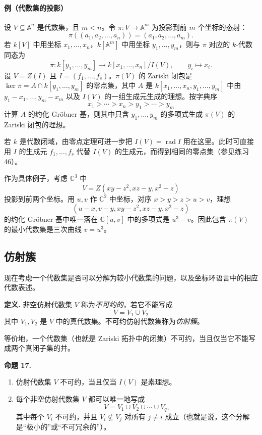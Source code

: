 \paragraph{例（代数集的投影）}
设 $V\subseteq\mathbb A^n$ 是代数集，且 $m<n$。令 $\pi:V\to\mathbb A^m$ 为投影到前 $m$ 个坐标的态射：
\[
\pi((a_1,a_2,\ldots,a_n))=(a_1,a_2,\ldots,a_m).
\]
若 $k[V]$ 中用坐标 $x_1,
\ldots,x_n$，$k[\mathbb A^m]$ 中用坐标 $y_1,
\ldots,y_m$，则与 $\pi$ 对应的 $k$-代数同态为
\[
\overline\pi:k[y_1,
\ldots,y_m]\longrightarrow k[x_1,
\ldots,x_n]/I(V),\qquad y_i\longmapsto x_i.
\]
设 $V=Z(I)$ 且 $I=(f_1,
\ldots,f_s)$。$\pi(V)$ 的 Zariski 闭包是 $\ker\overline\pi=A\cap k[y_1,
\ldots,y_m]$ 的零点集，其中 $A$ 是 $k[x_1,
\ldots,x_n,y_1,
\ldots,y_m]$ 中由 $y_1-x_1,
\ldots,y_m-x_m$ 以及 $I(V)$ 的一组生成元生成的理想。按字典序
\[
x_1>\cdots>x_n>y_1>\cdots>y_m
\]
计算 $A$ 的约化 Gröbner 基，则其中只含 $y_1,
\ldots,y_m$ 的多项式生成 $\pi(V)$ 的 Zariski 闭包的理想。

若 $k$ 是代数闭域，由零点定理可进一步把 $I(V)=\operatorname{rad}I$ 用在这里。此时可直接用 $I$ 的生成元 $f_1,
\ldots,f_s$ 代替 $I(V)$ 的生成元，而得到相同的零点集（参见练习 46）。

作为具体例子，考虑 $\mathbb C^3$ 中
\[
V=Z(xy-z^2,
xz-y,
x^2-z)
\]
投影到前两个坐标。用 $u,v$ 作 $\mathbb C^2$ 中坐标，对序 $x>y>z>u>v$，理想
\[
(u-x,
v-y,
xy-z^2,
xz-y,
x^2-z)
\]
的约化 Gröbner 基中唯一落在 $\mathbb C[u,v]$ 中的多项式是 $u^3-v$。因此包含 $\pi(V)$ 的最小代数集是三次曲线 $v=u^3$。

\subsection*{仿射簇}

现在考虑一个代数集是否可以分解为较小代数集的问题，以及坐标环语言中的相应代数表述。

\noindent\textbf{定义.} 非空仿射代数集 $V$ 称为\emph{不可约的}，若它不能写成
\[
V=V_1\cup V_2
\]
其中 $V_1,V_2$ 是 $V$ 中的真代数集。不可约仿射代数集称为\emph{仿射簇}。

等价地，一个代数集（也就是 Zariski 拓扑中的闭集）不可约，当且仅当它不能写成两个真闭子集的并。

\noindent\textbf{命题 17.}
\begin{enumerate}[label=(\arabic*)]
	\item 仿射代数集 $V$ 不可约，当且仅当 $I(V)$ 是素理想。
	\item 每个非空仿射代数集 $V$ 都可以唯一地写成
	\[
	V=V_1\cup V_2\cup\cdots\cup V_q,
	\]
	其中每个 $V_i$ 不可约，并且 $V_i\not\subseteq V_j$ 对所有 $j\ne i$ 成立（也就是说，这个分解是“极小的”或“不可冗余的”）。
\end{enumerate}

